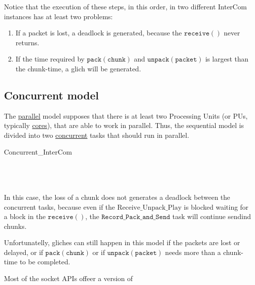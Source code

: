 Notice that the execution of these steps, in this order, in two
different InterCom instances has at least two problems:
\begin{enumerate}
\item If a packet is lost, a deadlock is generated, because the
  $\mathtt{receive()}$ never returns.
\item If the time required by $\mathtt{pack(chunk)}$ and
  $\mathtt{unpack(packet)}$ is largest than the chunk-time, a glich
  will be generated.
\end{enumerate}

\subsection{Concurrent model}

The \href{https://en.wikipedia.org/wiki/Parallel_computing}{parallel}
model supposes that there is at least two Processing Units (or PUs,
typically
\href{https://en.wikipedia.org/wiki/Multi-core_processor}{cores}),
that are able to work in parallel. Thus, the sequential model is
divided into two
\href{https://en.wikipedia.org/wiki/Concurrency_(computer_science)}{concurrent}
tasks that should run in parallel.

\begin{pseudocode}{Concurrent\_InterCom}{~}
  \BEGIN
     \GETS {}\\
     \GETS {}\\
  \END
  \ENDPROCEDURE
  \BEGIN
     \GETS {}\\
     \GETS {}\\
  \END
  \ENDPROCEDURE
\end{pseudocode}

In this case, the loss of a chunk does not generates a deadlock
between the concurrent tasks, because even if the
$\mathrm{Receive\_Unpack\_Play}$ is blocked waiting for a block in the
$\mathtt{receive()}$, the $\mathtt{Record\_Pack\_and\_Send}$ task will
continue sendind chunks.

Unfortunatelly, gliches can still happen in this model if the packets
are lost or delayed, or if $\mathtt{pack(chunk)}$ or if
$\mathtt{unpack(packet)}$ needs more than a chunk-time to be
completed.

Most of the socket APIs offeer a version of 

